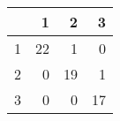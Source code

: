 \begin{tabular}{rrrr}
  \hline
 & 1 & 2 & 3 \\ 
  \hline
1 &  22 &   1 &   0 \\ 
  2 &   0 &  19 &   1 \\ 
  3 &   0 &   0 &  17 \\ 
   \hline
\end{tabular}
